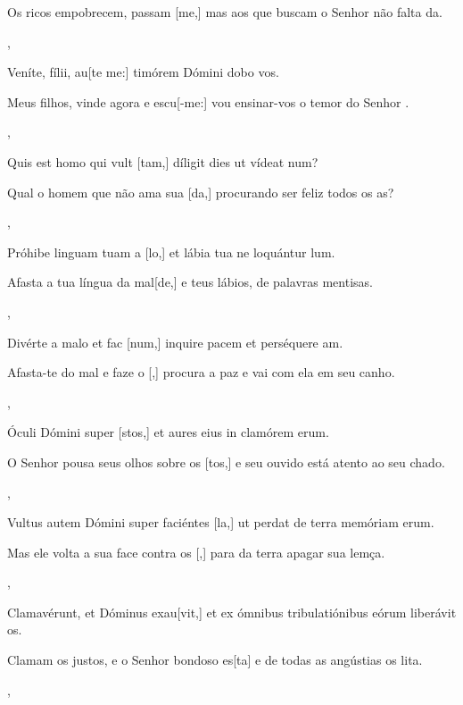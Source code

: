 {    {\item {}Os ricos empobrecem, passam [me,] mas aos que buscam o Senhor não falta da.~\Responsorium},
  {\item {}Veníte, fílii, au[te me:] timórem Dómini dobo vos.~\Responsorium}%
    {\item {}Meus filhos, vinde agora e escu[-me:] vou ensinar-vos o temor do Senhor .~\Responsorium},
  {\item {}Quis est homo qui vult [tam,] díligit dies ut vídeat \-num?~\Responsorium}%
    {\item {}Qual o homem que não ama sua [da,] procurando ser feliz todos os as?~\Responsorium},
  {\item {}Próhibe linguam tuam a [lo,] et lábia tua ne lo\-quántur \-lum.~\Responsorium}%
    {\item {}Afasta a tua língua da mal[de,] e teus lábios, de palavras mentisas.~\Responsorium},
  {\item {}Divérte a malo et fac [num,] inquire pacem et perséquere am.~\Responsorium}%
    {\item {}Afasta-te do mal e faze o [,] procura a paz e vai com ela em seu canho.~\Responsorium},
  {\item {}Óculi Dómini super [stos,] et aures eius in clamórem erum.~\Responsorium}%
    {\item {}O Senhor pousa seus olhos sobre os [tos,]
    e seu ouvido está atento ao seu chado.~\Responsorium},
  {\item {}Vultus autem Dómini super faciéntes [la,] ut perdat de ter\-ra memóriam erum.~\Responsorium}%
    {\item {}Mas ele volta a sua face contra os [,] para da terra apagar sua lemça.~\Responsorium},
  {\item {}Clamavérunt, et Dóminus exau[vit,] et ex ómnibus tribulatiónibus eórum liberávit os.~\Responsorium}%
    {\item {}Clamam os justos, e o Senhor bondoso es[ta] e de todas as angústias os lita.~\Responsorium},
}
